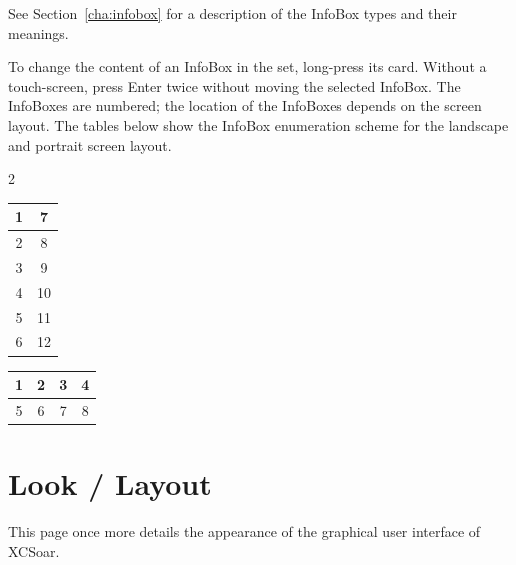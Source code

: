 See Section~\ref{cha:infobox} for a description of the InfoBox types and their meanings.

To change the content of an InfoBox in the set, long-press its card.
Without a touch-screen, press Enter twice without moving the selected
InfoBox.
The InfoBoxes are numbered; the location of the InfoBoxes depends on the screen layout.  
The tables below show the InfoBox enumeration scheme for the
landscape and portrait screen layout.

\begin{multicols}{2}
\begin{tabular}{|c|c|}
\hline
1 & 7 \\
\hline
2 & 8 \\
\hline
3 & 9 \\
\hline
4 & 10 \\
\hline
5 & 11 \\
\hline
6 & 12 \\
\hline
\end{tabular}

\begin{tabular}{|c|c|c|c|}
\hline
1 & 2 & 3 & 4 \\
\hline
\hline
5 & 6 & 7 & 8 \\
\hline
\end{tabular}
\end{multicols}


\section{Look / Layout}\label{sec:interface-appearance}
\label{conf:interface-appearance}

This page once more details the appearance of the graphical user interface of XCSoar.

